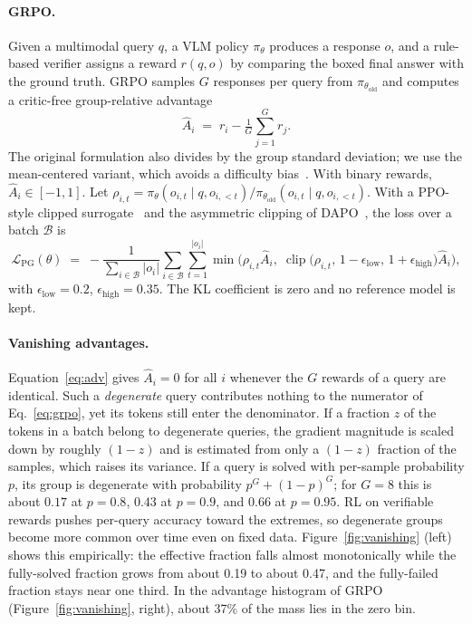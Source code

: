 \documentclass{article}
\begin{document}
\paragraph{GRPO.} Given a multimodal query $q$, a VLM policy $\pi_\theta$ produces a response $o$, and a rule-based verifier assigns a reward $r(q,o)$ by comparing the boxed final answer with the ground truth. GRPO samples $G$ responses per query from $\pi_{\theta_{\text{old}}}$ and computes a critic-free group-relative advantage
\begin{equation}
\hat A_i \;=\; r_i - \tfrac{1}{G}\textstyle\sum_{j=1}^{G} r_j .
\label{eq:adv}
\end{equation}
The original formulation also divides by the group standard deviation; we use the mean-centered variant, which avoids a difficulty bias~\citep{drgrpo}. With binary rewards, $\hat A_i\in[-1,1]$. Let $\rho_{i,t}=\pi_\theta(o_{i,t}\mid q,o_{i,<t})/\pi_{\theta_{\text{old}}}(o_{i,t}\mid q,o_{i,<t})$. With a PPO-style clipped surrogate~\citep{ppo} and the asymmetric clipping of DAPO~\citep{dapo}, the loss over a batch $\mathcal{B}$ is
\begin{equation}
\mathcal{L}_{\text{PG}}(\theta) \;=\; -\frac{1}{\sum_{i\in\mathcal B}|o_i|}\sum_{i\in\mathcal B}\sum_{t=1}^{|o_i|}\min\!\Big(\rho_{i,t}\hat A_i,\;\operatorname{clip}\big(\rho_{i,t},\,1-\epsilon_{\text{low}},\,1+\epsilon_{\text{high}}\big)\hat A_i\Big),
\label{eq:grpo}
\end{equation}
with $\epsilon_{\text{low}}=0.2$, $\epsilon_{\text{high}}=0.35$. The KL coefficient is zero and no reference model is kept.

\paragraph{Vanishing advantages.} Equation~\eqref{eq:adv} gives $\hat A_i=0$ for all $i$ whenever the $G$ rewards of a query are identical. Such a \emph{degenerate} query contributes nothing to the numerator of Eq.~\eqref{eq:grpo}, yet its tokens still enter the denominator. If a fraction $z$ of the tokens in a batch belong to degenerate queries, the gradient magnitude is scaled down by roughly $(1-z)$ and is estimated from only a $(1-z)$ fraction of the samples, which raises its variance. If a query is solved with per-sample probability $p$, its group is degenerate with probability $p^{G}+(1-p)^{G}$; for $G=8$ this is about $0.17$ at $p=0.8$, $0.43$ at $p=0.9$, and $0.66$ at $p=0.95$. RL on verifiable rewards pushes per-query accuracy toward the extremes, so degenerate groups become more common over time even on fixed data. Figure~\ref{fig:vanishing} (left) shows this empirically: the effective fraction falls almost monotonically while the fully-solved fraction grows from about 0.19 to about 0.47, and the fully-failed fraction stays near one third. In the advantage histogram of GRPO (Figure~\ref{fig:vanishing}, right), about 37\% of the mass lies in the zero bin.
\end{document}
